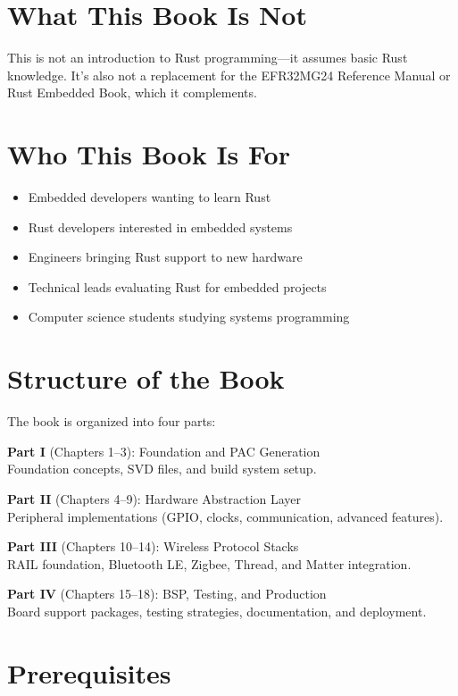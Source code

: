 \documentclass[11pt,a4paper,twoside,openright]{book}
\begin{document}
\section*{What This Book Is Not}

This is not an introduction to Rust programming---it assumes basic Rust knowledge. It's also not a replacement for the EFR32MG24 Reference Manual or Rust Embedded Book, which it complements.

\section*{Who This Book Is For}

\begin{itemize}
    \item Embedded developers wanting to learn Rust
    \item Rust developers interested in embedded systems
    \item Engineers bringing Rust support to new hardware
    \item Technical leads evaluating Rust for embedded projects
    \item Computer science students studying systems programming
\end{itemize}

\section*{Structure of the Book}

The book is organized into four parts:

\textbf{Part I} (Chapters 1--3): Foundation and PAC Generation
\\Foundation concepts, SVD files, and build system setup.

\textbf{Part II} (Chapters 4--9): Hardware Abstraction Layer
\\Peripheral implementations (GPIO, clocks, communication, advanced features).

\textbf{Part III} (Chapters 10--14): Wireless Protocol Stacks
\\RAIL foundation, Bluetooth LE, Zigbee, Thread, and Matter integration.

\textbf{Part IV} (Chapters 15--18): BSP, Testing, and Production
\\Board support packages, testing strategies, documentation, and deployment.

\section*{Prerequisites}
\end{document}
